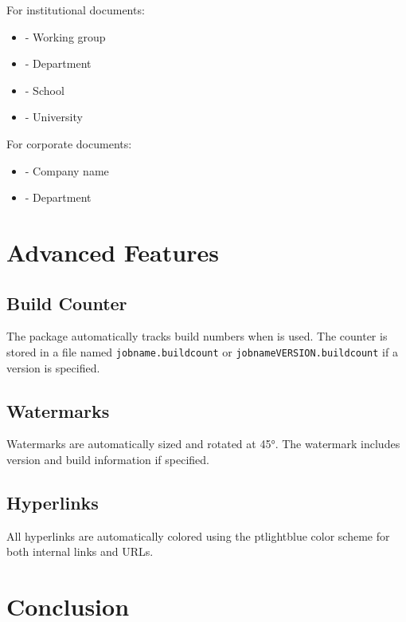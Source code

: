 \documentclass[11pt,letterpaper]{article}
\begin{document}
For institutional documents:
\begin{itemize}
    \item {} - Working group
    \item {} - Department
    \item {} - School
    \item {} - University
\end{itemize}

For corporate documents:
\begin{itemize}
    \item {} - Company name
    \item {} - Department
\end{itemize}

\section{Advanced Features}

\subsection{Build Counter}

The package automatically tracks build numbers when  is used. The counter is stored in a file named \texttt{jobname.buildcount} or \texttt{jobnameVERSION.buildcount} if a version is specified.

\subsection{Watermarks}

Watermarks are automatically sized and rotated at 45°. The watermark includes version and build information if specified.

\subsection{Hyperlinks}

All hyperlinks are automatically colored using the ptlightblue color scheme for both internal links and URLs.

\section{Conclusion}
\end{document}
